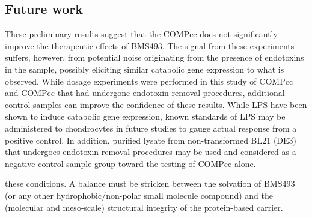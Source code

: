 \begin{refsection}
\subsection{Future work}
\label{sec:future_work_endotoxin}
These preliminary results suggest that the COMPcc does not significantly improve
the therapeutic effects of BMS493. The signal from these experiments suffers,
however, from potential noise originating from the presence of endotoxins in the
sample, possibly eliciting similar catabolic gene expression to what is
observed. While dosage experiments were performed in this study of COMPcc and
COMPcc that had undergone endotoxin removal procedures, additional control
samples can improve the confidence of these results. While LPS have been shown
to induce catabolic gene expression, known standards of LPS may be administered
to chondrocytes in future studies to gauge actual response from a positive
control. In addition, purified lysate from non-transformed BL21 (DE3)
 that undergoes endotoxin removal procedures may be used and
considered as a negative control sample group toward the testing of COMPcc
alone.

these conditions. A balance must be stricken between the solvation of BMS493 (or
any other hydrophobic/non-polar small molecule compound) and the (molecular and
meso-scale) structural integrity of the protein-based carrier.

\printbibliography[heading=subbibliography]

\end{refsection}
